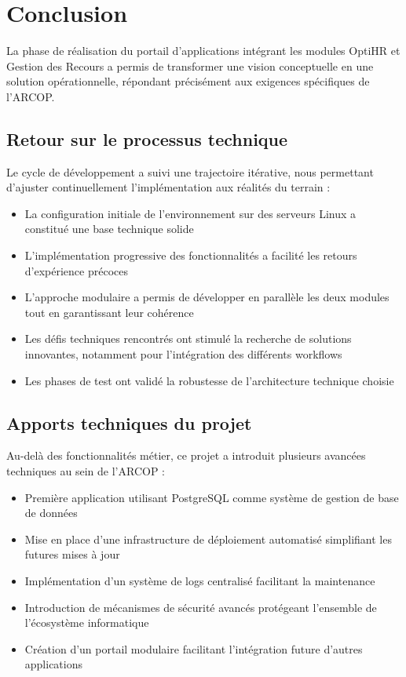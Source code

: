 \section{Conclusion}

La phase de réalisation du portail d'applications intégrant les modules OptiHR et Gestion des Recours a permis de transformer une vision conceptuelle en une solution opérationnelle, répondant précisément aux exigences spécifiques de l'ARCOP.

\subsection{Retour sur le processus technique}

Le cycle de développement a suivi une trajectoire itérative, nous permettant d'ajuster continuellement l'implémentation aux réalités du terrain :

\begin{itemize}
    \item La configuration initiale de l'environnement sur des serveurs Linux a constitué une base technique solide
    \item L'implémentation progressive des fonctionnalités a facilité les retours d'expérience précoces
    \item L'approche modulaire a permis de développer en parallèle les deux modules tout en garantissant leur cohérence
    \item Les défis techniques rencontrés ont stimulé la recherche de solutions innovantes, notamment pour l'intégration des différents workflows
    \item Les phases de test ont validé la robustesse de l'architecture technique choisie
\end{itemize}

\subsection{Apports techniques du projet}

Au-delà des fonctionnalités métier, ce projet a introduit plusieurs avancées techniques au sein de l'ARCOP :

\begin{itemize}
    \item Première application utilisant PostgreSQL comme système de gestion de base de données
    \item Mise en place d'une infrastructure de déploiement automatisé simplifiant les futures mises à jour
    \item Implémentation d'un système de logs centralisé facilitant la maintenance
    \item Introduction de mécanismes de sécurité avancés protégeant l'ensemble de l'écosystème informatique
    \item Création d'un portail modulaire facilitant l'intégration future d'autres applications
\end{itemize}

